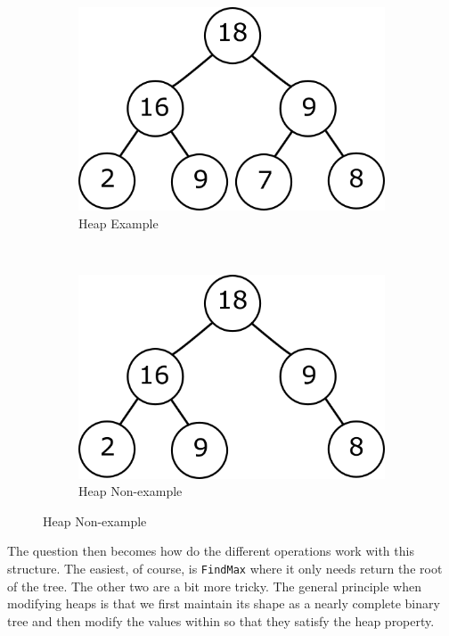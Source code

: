 \begin{figure}[h]
    \centering
    \begin{subfigure}[b]{0.4\textwidth}
        \includegraphics[scale = 0.3]{Images/heap_example.png}
        \caption{Heap Example}
        \label{fig:rsource}
    \end{subfigure}
    ~
    \begin{subfigure}[b]{0.4\textwidth}
        \includegraphics[scale=0.3]{Images/heap_non_example.png}
        \caption{Heap Non-example}
        \label{fig:lsource}
    \end{subfigure}
\end{figure}

The question then becomes how do the different operations work with this structure. The easiest, of course, is \texttt{FindMax} where it only needs return the root of the tree. The other two are a bit more tricky. The general principle when modifying heaps is that we first maintain its shape as a nearly complete binary tree and then modify the values within so that they satisfy the heap property.

